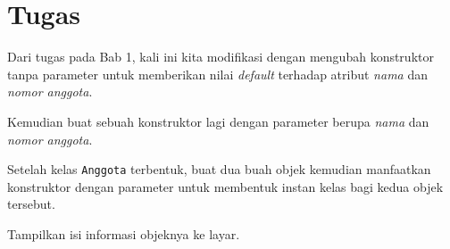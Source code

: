 \section{Tugas}

Dari tugas pada Bab 1, kali ini kita modifikasi dengan mengubah konstruktor tanpa parameter untuk memberikan nilai \textit{default} terhadap atribut \textit{nama} dan \textit{nomor anggota}.

Kemudian buat sebuah konstruktor lagi dengan parameter berupa \textit{nama} dan \textit{nomor anggota}. 

Setelah kelas \texttt{Anggota} terbentuk, buat dua buah objek kemudian manfaatkan konstruktor dengan parameter untuk membentuk instan kelas bagi kedua objek tersebut.

Tampilkan isi informasi objeknya ke layar.